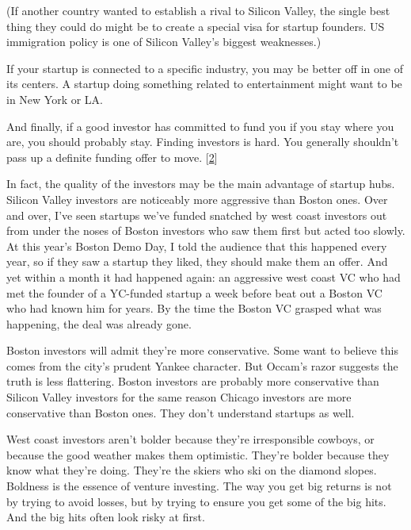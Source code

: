 (If another country wanted to
                  establish a rival to Silicon Valley, the single best thing
                  they could do might be to create a special visa for startup
                  founders. US immigration policy is one of Silicon Valley's
                  biggest weaknesses.)

If your startup is connected
                  to a specific industry, you may be better off in one of its
                  centers. A startup doing something related to entertainment
                  might want to be in New York or LA.

And finally, if
                  a good investor has committed to fund you if you stay where
                  you are, you should probably stay. Finding investors is hard.
                  You generally shouldn't pass up a definite funding offer to
                  move.
                  [\href{\#f2n}{2}]

In fact, the quality of the investors may be the
                  main advantage of startup hubs. Silicon Valley investors are
                  noticeably more aggressive than Boston ones. Over and over,
                  I've seen startups we've funded snatched by west coast
                  investors out from under the noses of Boston investors who saw
                  them first but acted too slowly. At this year's Boston Demo
                  Day, I told the audience that this happened every year, so if
                  they saw a startup they liked, they should make them an offer.
                  And yet within a month it had happened again: an aggressive
                  west coast VC who had met the founder of a YC-funded startup a
                  week before beat out a Boston VC who had known him for years.
                  By the time the Boston VC grasped what was happening, the deal
                  was already gone.

Boston investors will admit
                  they're more conservative. Some want to believe this comes
                  from the city's prudent Yankee character. But Occam's razor
                  suggests the truth is less flattering. Boston investors are
                  probably more conservative than Silicon Valley investors for
                  the same reason Chicago investors are more conservative than
                  Boston ones. They don't understand startups as well.

West
                  coast investors aren't bolder because they're irresponsible
                  cowboys, or because the good weather makes them optimistic.
                  They're bolder because they know what they're doing. They're
                  the skiers who ski on the diamond slopes. Boldness is the
                  essence of venture investing. The way you get big returns is
                  not by trying to avoid losses, but by trying to ensure you get
                  some of the big hits. And the big hits often look risky at
                  first.

